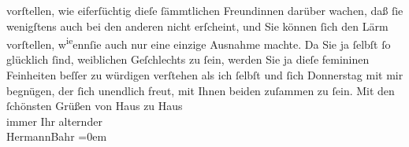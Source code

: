\begin{ledgroupsized}[t]{13cm}
               vorſtellen, wie eiferſüchtig {\pb}dieſe ſämmtlichen
               Freundinnen darüber wachen, daß ſie wenigſtens auch bei den anderen nicht erſcheint,
               und Sie können ſich den Lärm vorſtellen, w\substVorne{}\textsuperscript{ie}\substDazwischen{}enn\substHinten{}{ }ſie auch nur eine einzige
               Ausnahme machte. Da Sie ja ſelbſt ſo glücklich ſind, weiblichen Geſchlechts zu ſein,
               werden Sie ja dieſe femininen Feinheiten beſſer zu würdigen verſtehen als ich ſelbſt
               und ſich Donnerstag mit mir begnügen, der ſich unendlich freut, mit
               Ihnen beiden zuſammen zu
               ſein.\pend
           \pstart
           Mit den ſchönsten Grüßen von Haus zu Haus{\\[\baselineskip]}immer Ihr alternder{\\[\baselineskip]}\spacefill\mbox{HermannBahr}\pend
           \leftskip=0em{}
         
         \endnumbering{}\end{ledgroupsized}  \newcommand{\dateiname}{L02060}\newcommand{\titel}{Hermann Bahr an Olga Schnitzler, 27. 4. 1912}\newcommand{\editorInnen}{Martin Anton Müller und Gerd-Hermann Susen}
      